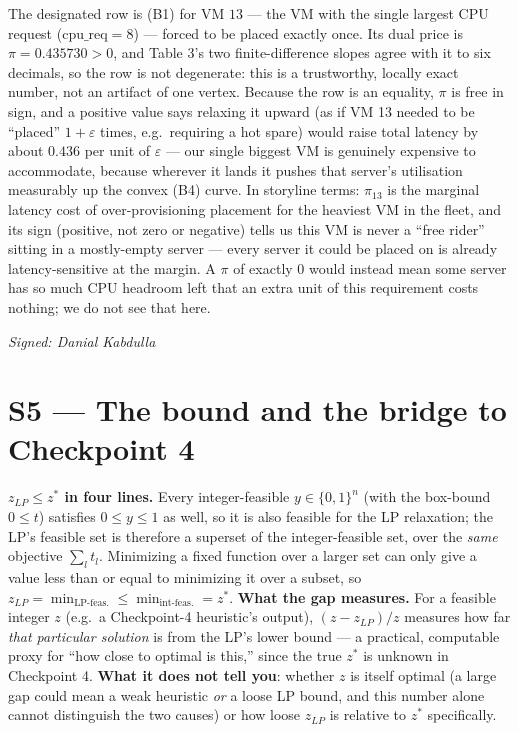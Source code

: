 \documentclass[11pt]{article}
\begin{document}
The designated row is (B1) for VM $13$ --- the VM with the single largest CPU request
($\text{cpu\_req}{=}8$) --- forced to be placed exactly once. Its dual price is
$\pi=0.435730>0$, and Table 3's two finite-difference slopes agree with it to six decimals, so the
row is not degenerate: this is a trustworthy, locally exact number, not an artifact of one vertex.
Because the row is an equality, $\pi$ is free in sign, and a positive value says relaxing it
upward (as if VM 13 needed to be ``placed'' $1+\varepsilon$ times, e.g.\ requiring a hot spare)
would raise total latency by about $0.436$ per unit of $\varepsilon$ --- our single biggest VM is
genuinely expensive to accommodate, because wherever it lands it pushes that server's utilisation
measurably up the convex (B4) curve. In storyline terms: $\pi_{13}$ is the marginal latency cost
of over-provisioning placement for the heaviest VM in the fleet, and its sign (positive, not zero
or negative) tells us this VM is never a ``free rider'' sitting in a mostly-empty server --- every
server it could be placed on is already latency-sensitive at the margin. A $\pi$ of exactly $0$
would instead mean some server has so much CPU headroom left that an extra unit of this
requirement costs nothing; we do not see that here.

\vspace{4pt}\noindent\textit{Signed: Danial Kabdulla}

\section{S5 --- The bound and the bridge to Checkpoint 4}

\textbf{$z_{LP}\le z^\ast$ in four lines.} Every integer-feasible $y\in\{0,1\}^n$ (with the
box-bound $0\le t$) satisfies $0\le y\le1$ as well, so it is also feasible for the LP relaxation;
the LP's feasible set is therefore a superset of the integer-feasible set, over the \emph{same}
objective $\sum_l t_l$. Minimizing a fixed function over a larger set can only give a value less
than or equal to minimizing it over a subset, so $z_{LP}=\min_{\text{LP-feas.}}\le
\min_{\text{int-feas.}}=z^\ast$. \textbf{What the gap measures.} For a feasible integer $z$
(e.g.\ a Checkpoint-4 heuristic's output), $(z-z_{LP})/z$ measures how far \emph{that particular
solution} is from the LP's lower bound --- a practical, computable proxy for ``how close to optimal
is this,'' since the true $z^\ast$ is unknown in Checkpoint 4. \textbf{What it does not tell you}:
whether $z$ is itself optimal (a large gap could mean a weak heuristic \emph{or} a loose LP bound,
and this number alone cannot distinguish the two causes) or how loose $z_{LP}$ is relative to
$z^\ast$ specifically.
\end{document}
